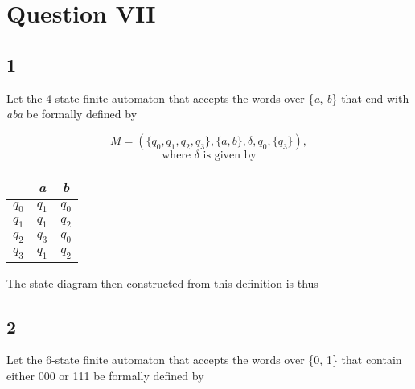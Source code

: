 \documentclass{article}
\begin{document}
\section*{Question VII}

\subsection{1} 

Let the 4-state finite automaton that accepts the words over \{\textit{a}, \textit{b}\} that end with \textit{aba} be formally defined by

\[
M = \left(\{q_0, q_1, q_2, q_3\}, \{\textit{a},
\textit{b}\}, \delta, q_0, \{q_3\} \right),
\]
\[\textrm{where } \delta \textrm{ is given by} \] 
\begin{center}
    \begin{tabular}{c|cc}
    & \textit{a} & \textit{b}\\ \hline
    $q_0$ & $q_1$ & $q_0$ \\
    $q_1$ & $q_1$ & $q_2$ \\
    $q_2$ & $q_3$ & $q_0$ \\
    $q_3$ & $q_1$ & $q_2$
    \end{tabular}
\end{center}

The state diagram then constructed from this definition is thus

\begin{center}
\end{center}

\subsection{2}

Let the 6-state finite automaton that accepts the words over \{0, 1\} that contain either 000 or 111 be formally defined by
\end{document}
